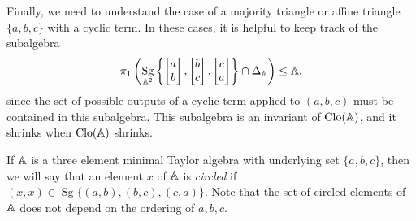 \documentclass[letterpaper,11pt]{article}
\DeclareMathOperator{\Clo}{Clo}
\DeclareMathOperator{\Sg}{Sg}
\begin{document}
Finally, we need to understand the case of a majority triangle or affine triangle $\{a,b,c\}$ with a cyclic term. In these cases, it is helpful to keep track of the subalgebra
\[
\pi_1\left(\Sg_{\bA^2}\left\{\begin{bmatrix} a\\ b\end{bmatrix}, \begin{bmatrix} b\\ c\end{bmatrix}, \begin{bmatrix} c\\ a\end{bmatrix}\right\} \cap \Delta_\bA\right) \le \bA,
\]
since the set of possible outputs of a cyclic term applied to $(a,b,c)$ must be contained in this subalgebra. This subalgebra is an invariant of $\Clo(\bA)$, and it shrinks when $\Clo(\bA)$ shrinks.

\begin{defn} If $\mathbb{A}$ is a three element minimal Taylor algebra with underlying set $\{a,b,c\}$, then we will say that an element $x$ of $\mathbb{A}$ is \emph{circled} if $(x,x) \in \Sg\{(a,b),(b,c),(c,a)\}$. Note that the set of circled elements of $\mathbb{A}$ does not depend on the ordering of $a,b,c$.
\end{defn}
\end{document}
